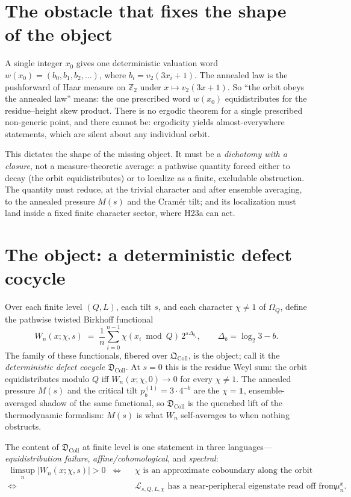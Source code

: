 \documentclass[11pt]{article}
\newcommand{\Z}{\mathbb{Z}}
\newcommand{\Lcal}{\mathcal{L}}
\newcommand{\Om}{\Omega}
\newcommand{\Qcoll}{\mathfrak{Q}_{\mathrm{Coll}}}
\newcommand{\Dcoll}{\mathfrak{D}_{\mathrm{Coll}}}
\theoremstyle{plain}
\theoremstyle{remark}
\begin{document}
\section{The obstacle that fixes the shape of the object}

A single integer $x_0$ gives one deterministic valuation word
$w(x_0)=(b_0,b_1,b_2,\dots)$, where $b_i=v_2(3x_i+1)$. The annealed law is the
pushforward of Haar measure on $\Z_2$ under $x\mapsto v_2(3x+1)$. So ``the orbit
obeys the annealed law'' means: the one prescribed word $w(x_0)$ equidistributes
for the residue--height skew product. There is no ergodic theorem for a single
prescribed non-generic point, and there cannot be: ergodicity yields
almost-everywhere statements, which are silent about any individual orbit.

This dictates the shape of the missing object. It must be a \emph{dichotomy with
a closure}, not a measure-theoretic average: a pathwise quantity forced either to
decay (the orbit equidistributes) or to localize as a finite, excludable
obstruction. The quantity must reduce, at the trivial character and after
ensemble averaging, to the annealed pressure $M(s)$ and the Cram\'er tilt; and its
localization must land inside a fixed finite character sector, where
\textsf{H23a} can act.

\section{The object: a deterministic defect cocycle}

Over each finite level $(Q,L)$, each tilt $s$, and each character $\chi\ne 1$ of
$\Om_Q$, define the pathwise twisted Birkhoff functional
\[
W_n(x;\chi,s)\;=\;\frac1n\sum_{i=0}^{n-1}\chi(x_i\bmod Q)\,2^{s\Delta_{b_i}},
\qquad \Delta_b=\log_2 3-b .
\]
The family of these functionals, fibered over $\Qcoll$, is the object; call it the
\emph{deterministic defect cocycle} $\Dcoll$. At $s=0$ this is the residue Weyl
sum: the orbit equidistributes modulo $Q$ iff $W_n(x;\chi,0)\to0$ for every
$\chi\ne1$. The annealed pressure $M(s)$ and the critical tilt
$p^{(1)}_b=3\cdot4^{-b}$ are the $\chi=\mathbf1$, ensemble-averaged shadow of the
same functional, so $\Dcoll$ is the quenched lift of the thermodynamic formalism:
$M(s)$ is what $W_n$ self-averages to when nothing obstructs.

The content of $\Dcoll$ at finite level is one statement in three languages---%
\emph{equidistribution failure}, \emph{affine/cohomological}, and
\emph{spectral}:
\[
\begin{aligned}
\limsup_n \lvert W_n(x;\chi,s)\rvert > 0
\;\;\Longleftrightarrow\;\;&
\chi \text{ is an approximate coboundary along the orbit}\\[2pt]
\Longleftrightarrow\;\;&
\Lcal_{s,Q,L,\chi}\text{ has a near-peripheral eigenstate read off from }\mu_n^x .
\end{aligned}
\]
\end{document}
